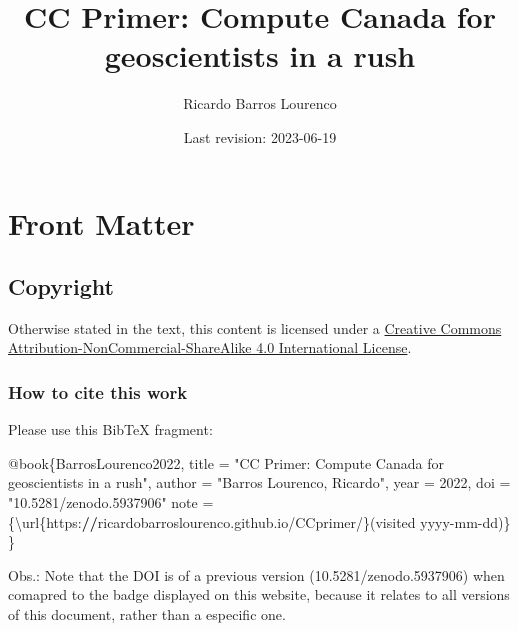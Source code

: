 \documentclass[
]{book}
\title{CC Primer: Compute Canada for geoscientists in a rush}
\author{Ricardo Barros Lourenco}
\date{Last revision: 2023-06-19}
\newenvironment{Shaded}{\begin{snugshade}}{\end{snugshade}}
\newcommand{\DecValTok}[1]{\textcolor[rgb]{0.00,0.00,0.81}{#1}}
\newcommand{\ErrorTok}[1]{\textcolor[rgb]{0.64,0.00,0.00}{\textbf{#1}}}
\newcommand{\NormalTok}[1]{#1}
\newcommand{\OtherTok}[1]{\textcolor[rgb]{0.56,0.35,0.01}{#1}}
\newcommand{\SpecialCharTok}[1]{\textcolor[rgb]{0.00,0.00,0.00}{#1}}
\newcommand{\StringTok}[1]{\textcolor[rgb]{0.31,0.60,0.02}{#1}}
\begin{document}
\maketitle

{
\setcounter{tocdepth}{1}
\tableofcontents
}
\hypertarget{front-matter}{%
\chapter{Front Matter}\label{front-matter}}

\hypertarget{copyright}{%
\section{Copyright}\label{copyright}}

Otherwise stated in the text, this content is licensed under a \href{http://creativecommons.org/licenses/by-nc-sa/4.0/}{Creative Commons Attribution-NonCommercial-ShareAlike 4.0 International License}.

\hypertarget{how-to-cite-this-work}{%
\subsection{How to cite this work}\label{how-to-cite-this-work}}

Please use this BibTeX fragment:

\begin{Shaded}
\begin{Highlighting}[]
\SpecialCharTok{@}\NormalTok{book\{BarrosLourenco2022,}
\NormalTok{  title     }\OtherTok{=} \StringTok{"CC Primer: Compute Canada for geoscientists in a rush"}\NormalTok{,}
\NormalTok{  author    }\OtherTok{=} \StringTok{"Barros Lourenco, Ricardo"}\NormalTok{,}
\NormalTok{  year      }\OtherTok{=} \DecValTok{2022}\NormalTok{,}
\NormalTok{  doi       }\OtherTok{=} \StringTok{"10.5281/zenodo.5937906"}
\NormalTok{  note      }\OtherTok{=}\NormalTok{ \{\textbackslash{}url\{https}\SpecialCharTok{:}\ErrorTok{//}\NormalTok{ricardobarroslourenco.github.io}\SpecialCharTok{/}\NormalTok{CCprimer}\SpecialCharTok{/}\NormalTok{\}(visited yyyy}\SpecialCharTok{{-}}\NormalTok{mm}\SpecialCharTok{{-}}\NormalTok{dd)\}}
\NormalTok{\}}
\end{Highlighting}
\end{Shaded}

Obs.: Note that the DOI is of a previous version (10.5281/zenodo.5937906) when
comapred to the badge displayed on this website, because it relates to all versions
of this document, rather than a especific one.
\end{document}
